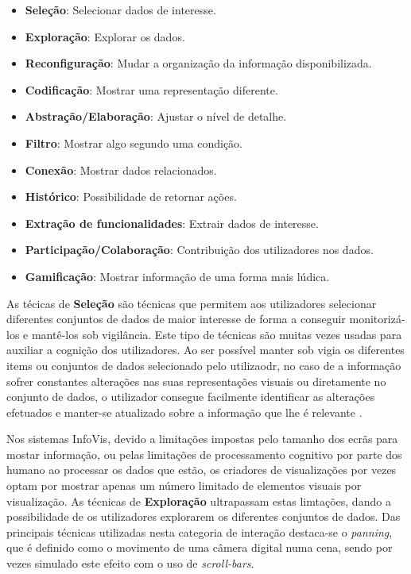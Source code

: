 \begin{itemize}
  \item \textbf{Seleção}: Selecionar dados de interesse.
  \item \textbf{Exploração}: Explorar os dados.
  \item \textbf{Reconfiguração}: Mudar a organização da informação disponibilizada.
  \item \textbf{Codificação}: Mostrar uma representação diferente.
  \item \textbf{Abstração/Elaboração}: Ajustar o nível de detalhe.
  \item \textbf{Filtro}: Mostrar algo segundo uma condição.
  \item \textbf{Conexão}: Mostrar dados relacionados.
  \item \textbf{Histórico}: Possibilidade de retornar ações. %
  \item \textbf{Extração de funcionalidades}: Extrair dados de interesse. %
  \item \textbf{Participação/Colaboração}: Contribuição dos utilizadores nos dados.
  \item \textbf{Gamificação}: Mostrar informação de uma forma mais lúdica.
\end{itemize}

As técicas de \textbf{Seleção} são técnicas que permitem aos utilizadores selecionar diferentes conjuntos de dados de maior interesse de forma a conseguir monitorizá-los e mantê-los sob vigilância. Este tipo de técnicas são muitas vezes usadas para auxiliar a cognição dos utilizadores. Ao ser possível manter sob vigia os diferentes items ou conjuntos de dados selecionado pelo utilizaodr, no caso de a informação sofrer constantes alterações nas suas representações visuais ou diretamente no conjunto de dados, o utilizador consegue facilmente identificar as alterações efetuados e manter-se atualizado sobre a informação que lhe é relevante \cite{yi2007toward, figueiras2015towards}.

Nos sistemas \gls{InfoVis}, devido a limitações impostas pelo tamanho dos ecrãs para mostar informação, ou pelas limitações de processamento cognitivo por parte dos humano ao processar os dados que estão, os criadores de visualizações por vezes optam por mostrar apenas um número limitado de elementos visuais por visualização. As técnicas de \textbf{Exploração} ultrapassam estas limtações, dando a possibilidade de os utilizadores explorarem os diferentes conjuntos de dados. Das principais técnicas utilizadas nesta categoria de interação destaca-se o \textit{panning}, que é definido como o movimento de uma câmera digital numa cena, sendo por vezes simulado este efeito com o uso de \textit{scroll-bars}. 


